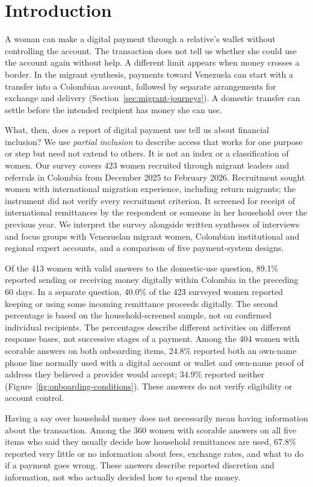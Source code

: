 \section{Introduction}
A woman can make a digital payment through a relative's wallet without controlling the account. The transaction does not tell us whether she could use the account again without help. A different limit appears when money crosses a border. In the migrant synthesis, payments toward Venezuela can start with a transfer into a Colombian account, followed by separate arrangements for exchange and delivery (Section~\ref{sec:migrant-journeys}). A domestic transfer can settle before the intended recipient has money she can use.

What, then, does a report of digital payment use tell us about financial inclusion? We use \emph{partial inclusion} to describe access that works for one purpose or step but need not extend to others. It is not an index or a classification of women. Our survey covers 423 women recruited through migrant leaders and referrals in Colombia from December 2025 to February 2026. Recruitment sought women with international migration experience, including return migrants; the instrument did not verify every recruitment criterion. It screened for receipt of international remittances by the respondent or someone in her household over the previous year. We interpret the survey alongside written syntheses of interviews and focus groups with Venezuelan migrant women, Colombian institutional and regional expert accounts, and a comparison of five payment-system designs.

Of the 413 women with valid answers to the domestic-use question, 89.1\% reported sending or receiving money digitally within Colombia in the preceding 60 days. In a separate question, 40.0\% of the 423 surveyed women reported keeping or using some incoming remittance proceeds digitally. The second percentage is based on the household-screened sample, not on confirmed individual recipients. The percentages describe different activities on different response bases, not successive stages of a payment. Among the 404 women with scorable answers on both onboarding items, 24.8\% reported both an own-name phone line normally used with a digital account or wallet and own-name proof of address they believed a provider would accept; 34.9\% reported neither (Figure~\ref{fig:onboarding-conditions}). These answers do not verify eligibility or account control.

Having a say over household money does not necessarily mean having information about the transaction. Among the 360 women with scorable answers on all five items who said they usually decide how household remittances are used, 67.8\% reported very little or no information about fees, exchange rates, and what to do if a payment goes wrong. These answers describe reported discretion and information, not who actually decided how to spend the money.

